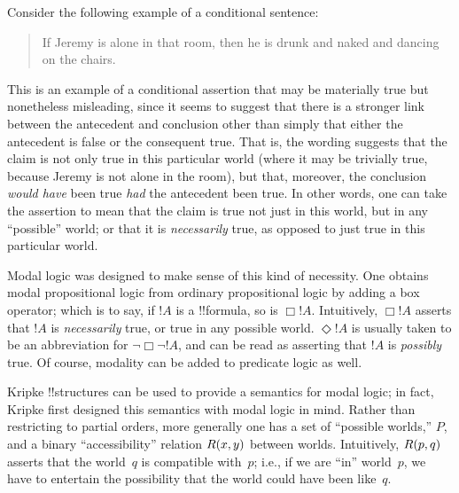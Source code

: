 \documentclass[../../../include/open-logic-section]{subfiles}
\begin{document}


Consider the following example of a conditional sentence:
\begin{quote}
  If Jeremy is alone in that room, then he is drunk and naked and
  dancing on the chairs.
\end{quote}
This is an example of a conditional assertion that may be materially
true but nonetheless misleading, since it seems to suggest that there
is a stronger link between the antecedent and conclusion other than
simply that either the antecedent is false or the consequent
true. That is, the wording suggests that the claim is not only true in
this particular world (where it may be trivially true, because Jeremy
is not alone in the room), but that, moreover, the conclusion
\emph{would have} been true \emph{had} the antecedent been true. In
other words, one can take the assertion to mean that the claim is true
not just in this world, but in any ``possible'' world; or that it is
\emph{necessarily} true, as opposed to just true in this particular
world.

Modal logic was designed to make sense of this kind of necessity. One
obtains modal propositional logic from ordinary
propositional logic by adding a box operator; which is to say, if
$!A$ is a !!{formula}, so is $\Box !A$.  Intuitively, $\Box !A$
asserts that $!A$ is \emph{necessarily} true, or true in any possible
world. $\Diamond !A$ is usually taken to be an abbreviation for
$\lnot \Box \lnot !A$, and can be read as asserting that $!A$ is
\emph{possibly} true. Of course, modality can be added to predicate
logic as well.

Kripke !!{structure}s can be used to provide a semantics for modal
logic; in fact, Kripke first designed this semantics with modal logic
in mind. Rather than restricting to partial orders, more generally one
has a set of ``possible worlds,'' $P$, and a binary ``accessibility''
relation $\mathord{R}(x,y)$ between worlds. Intuitively, $\mathord{R}(p,q)$
asserts that the world~$q$ is compatible with~$p$; i.e., if we are
``in'' world~$p$, we have to entertain the possibility that the
world could have been like~$q$.
\end{document}
